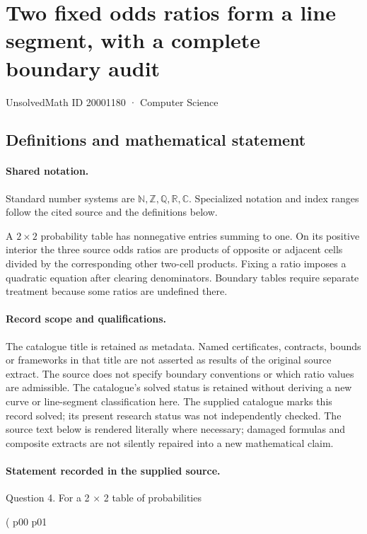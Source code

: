 \documentclass[11pt]{article}
\begin{document}
\setcounter{section}{20001179}
\section{Two fixed odds ratios form a line segment, with a complete boundary audit}\label{20001180}
{\small\sffamily UnsolvedMath ID 20001180 · Computer Science}
\subsection{Definitions and mathematical statement}

\paragraph{Shared notation.}Standard number systems are $\mathbb N,\mathbb Z,\mathbb Q,\mathbb R,\mathbb C$. Specialized notation and index ranges follow the cited source and the definitions below.


A $2\times2$ probability table has nonnegative entries summing to one. On its positive interior the three source odds ratios are products of opposite or adjacent cells divided by the corresponding other two-cell products. Fixing a ratio imposes a quadratic equation after clearing denominators. Boundary tables require separate treatment because some ratios are undefined there.
\paragraph{Record scope and qualifications.}
The catalogue title is retained as metadata. Named certificates, contracts, bounds or frameworks in that title are not asserted as results of the original source extract.
The source does not specify boundary conventions or which ratio values are admissible. The catalogue's solved status is retained without deriving a new curve or line-segment classification here. The supplied catalogue marks this record solved; its present research status was not independently checked.
The source text below is rendered literally where necessary; damaged formulas and composite extracts are not silently repaired into a new mathematical claim.
\paragraph{Statement recorded in the supplied source.}
Question 4. For a 2 × 2 table of probabilities

( p00 p01
\end{document}
